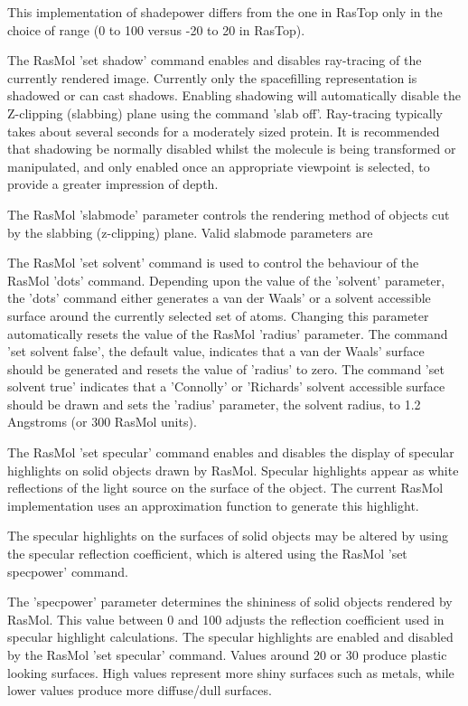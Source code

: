 This implementation of shadepower differs from the one in RasTop
only in the choice of range (0 to 100 versus -20 to 20 in RasTop).

The RasMol
'set shadow'
command enables and disables ray-tracing of the currently rendered image.
Currently only the spacefilling representation is shadowed or can cast
shadows. Enabling shadowing will automatically disable the Z-clipping
(slabbing) plane using the command
'slab off'.
Ray-tracing typically takes about several seconds for a moderately sized protein.
It is recommended that shadowing be normally disabled whilst the
molecule is being transformed or manipulated, and only enabled once
an appropriate viewpoint is selected, to provide a greater impression
of depth.

The RasMol
'slabmode'
parameter controls the rendering method of objects cut by the
slabbing (z-clipping) plane. Valid slabmode parameters are

The RasMol
'set solvent'
command is used to control the behaviour of the RasMol
'dots'
command. Depending upon the value of the
'solvent'
parameter, the
'dots'
command either generates a van der Waals' or a solvent
accessible surface around the currently selected set of
atoms. Changing this parameter automatically resets the
value of the RasMol
'radius'
parameter.
The command
'set solvent false',
the default value, indicates that a van der Waals' surface
should be generated and resets the value of
'radius'
to zero. The command
'set solvent true'
indicates that a 'Connolly' or 'Richards' solvent
accessible surface should be drawn and sets the
'radius'
parameter, the solvent radius, to 1.2 Angstroms (or 300
RasMol units).

The RasMol
'set specular'
command enables and disables the display of specular highlights on
solid objects drawn by RasMol. Specular highlights appear as white
reflections of the light source on the surface of the object. The
current RasMol implementation uses an approximation function to
generate this highlight.

The specular highlights on the surfaces of solid objects may be
altered by using the specular reflection coefficient, which is
altered using the RasMol
'set specpower'
command.

The
'specpower'
parameter determines the shininess of solid objects rendered by
RasMol. This value between 0 and 100 adjusts the reflection
coefficient used in specular highlight calculations. The specular
highlights are enabled and disabled by the RasMol
'set specular'
command. Values around 20 or 30 produce plastic looking surfaces.
High values represent more shiny surfaces such as metals, while
lower values produce more diffuse/dull surfaces.


